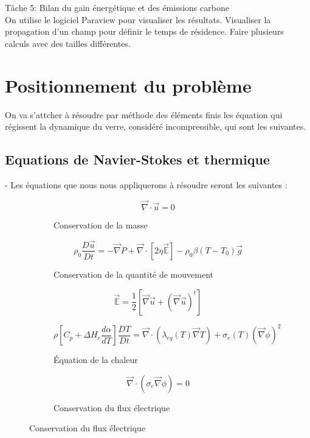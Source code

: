\documentclass[12pt, a4paper, french, BCOR = 0pt, DIV = 10]{scrartcl}
\begin{document}
    
    Tâche 5: Bilan du gain énergétique et des émissions carbone \\
    
    
    On  utilise le logiciel Paraview pour visualiser les résultats.
    Visualiser la propagation d'un champ pour définir le temps de résidence.
    Faire plusieurs calculs avec des tailles différentes.
    
    \section{Positionnement du problème}
    On va s'attcher à résoudre par méthode des éléments finis les équation qui régissent la dynamique du verre, considéré incompressible, qui sont les suivantes.
    
    \subsection{ Equations de Navier-Stokes et thermique}
    - Les équations que nous nous appliquerons à résoudre seront les suivantes : \\

    \begin{figure}[H]
        \centering
        \begin{subfigure}[c]{\textwidth}
            $$\vec {\nabla} \cdot \vec{u} = 0$$
            \caption{Conservation de la masse}
        \end{subfigure}
        \begin{subfigure}[c]{\textwidth}
            $$\rho_{0} \frac{D\vec{u}}{Dt} = - \vec {\nabla} P + \vec {\nabla} \cdot [ 2 \eta \vec{\mathbb{E}}] - \rho_{0} \beta (T-T_{0}) \vec{g} $$
            \caption{Conservation de la quantité de mouvement}
        \end{subfigure}
        \begin{subfigure}[c]{\textwidth}
            $$\vec{\mathbb{E}} = \frac{1}{2} [\vec{\nabla} \vec{u} + (\vec{\nabla} \vec{u})^t ]$$
            \caption{}
        \end{subfigure}
        \begin{subfigure}[c]{\textwidth}
            $$\rho [ C_{p}+ \Delta H_{r} \frac{d\alpha}{dT}] \frac{DT}{Dt} = \vec {\nabla} \cdot  (\lambda_{eq}(T) \vec{\nabla} T ) + \sigma_{e}(T) (\vec \nabla\phi)^2$$
            \caption{Équation de la chaleur}
        \end{subfigure}
        \begin{subfigure}[c]{\textwidth}
            $$\vec{\nabla} \cdot (\sigma_{e} \vec{\nabla} \phi) = 0$$
            \caption{Conservation du flux électrique}
        \end{subfigure}
        
    \end{figure}
\end{document}
